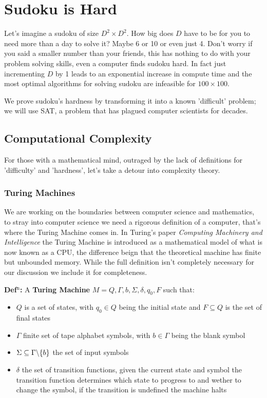 \documentclass[a4paper,11pt]{report}
\begin{document}
\chapter{Sudoku is Hard}

Let's imagine a sudoku of size $D^2\times D^2$. How big does $D$ have to be for you to need more than a day to solve it? Maybe 6 or 10 or even just 4. Don't worry if you said a smaller number than your friends, this has nothing to do with your problem solving skills, even a computer finds sudoku hard. In fact just incrementing $D$ by 1 leads to an exponential increase in compute time and the most optimal algorithms for solving sudoku are infeasible for $100 \times 100$.

We prove sudoku's hardness by transforming it into a known 'difficult' problem; we will use SAT, a problem that has plagued computer scientists for decades.

\section{Computational Complexity}

For those with a mathematical mind, outraged by the lack of definitions for 'difficulty' and 'hardness', let's take a detour into complexity theory.

\subsection{Turing Machines}

We are working on the boundaries between computer science and mathematics, to stray into computer science we need a rigorous definition of a computer, that's where the Turing Machine comes in. In Turing's paper \textit{Computing Machinery and Intelligence} \cite{turing} the Turing Machine is introduced as a mathematical model of what is now known as a CPU, the difference beign that the theoretical machine has finite but unbounded memory. While the full definition isn't completely necessary for our discussion we include it for completeness.

\textbf{Def$^\text{n}$:} A \textbf{Turing Machine} $M={Q,\Gamma,b,\Sigma, \delta, q_0, F}$ such that:
\begin{itemize}
\item $Q$ is a set of states, with $q_0\in Q$ being the initial state and $F\subseteq Q$ is the set of final states
\item $\Gamma$ finite set of tape alphabet symbols, with $b\in \Gamma$ being the blank symbol
\item $\Sigma\subseteq \Gamma \symbol{92} \{b\}$ the set of input symbols
\item $\delta$ the set of transition functions, given the current state and symbol the transition function determines which state to progress to and wether to change the symbol, if the transition is undefined the machine halts
\end{itemize}
\end{document}
